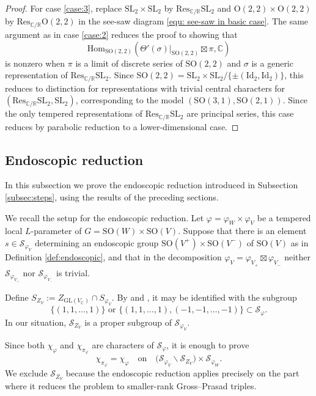 \documentclass[12pt]{amsart}
\numberwithin{equation}{subsection}
\newcommand{\BC}{{\mathbb {C}}}
\newcommand{\BR}{{\mathbb {R}}}
\newcommand{\CS}{{\mathcal {S}}}
\newcommand{\RO}{{\mathrm {O}}}
\newcommand{\GL}{{\mathrm{GL}}}
\newcommand{\Hom}{{\mathrm{Hom}}}
\newcommand{\Id}{{\mathrm{Id}}}
\newcommand{\Res}{{\mathrm{Res}}}
\newcommand{\SL}{{\mathrm{SL}}}
\newcommand{\SO}{{\mathrm{SO}}}
\newcommand{\bs}{\backslash}
\def\vphi{\varphi}
\def\SO{\mathrm{SO}}
\begin{document}
\begin{proof}
For case \eqref{case:3}, replace $\SL_2\times\SL_2$ by
$\Res_{\BC/\BR}\SL_2$ and $\RO(2,2)\times \RO(2,2)$ by
$\Res_{\BC/\BR}\RO(2,2)$ in the see-saw diagram
\eqref{equ: see-saw in basic case}. The same argument as in case
\eqref{case:2} reduces the proof to showing that
\[
\Hom_{\SO(2,2)}(\Theta'(\sigma)|_{\SO(2,2)}\boxtimes \pi,\BC)
\]
is nonzero when $\pi$ is a limit of discrete series of $\SO(2,2)$ and
$\sigma$ is a generic representation of $\Res_{\BC/\BR}\SL_2$. Since
$\SO(2,2)=\SL_2\times \SL_2/\{\pm (\Id_2,\Id_2)\}$, this reduces to
distinction for representations with trivial central characters for
$(\Res_{\BC/\BR}\SL_2,\SL_2)$, corresponding to the model
$(\SO(3,1),\SO(2,1))$. Since the only tempered representations of
$\Res_{\BC/\BR}\SL_2$ are principal series, this case reduces by parabolic
reduction to a lower-dimensional case.
\end{proof}

\subsection{Endoscopic reduction}\label{subsec:endoscopic}
In this subsection we prove the endoscopic reduction introduced in Subsection
\ref{subsec:steps}, using the results of the preceding sections.

We recall the setup for the endoscopic reduction. Let
$\vphi=\vphi_W\times \vphi_V$ be a tempered local $L$-parameter of
$G=\SO(W)\times \SO(V)$. Suppose that there is an element
$s\in \mathcal{S}_{\varphi_V}$ determining an endoscopic group
$\SO(V^+)\times \SO(V^-)$ of $\SO(V)$ as in Definition
\ref{def:endoscopic}, and that in the decomposition
$\varphi_V=\varphi_{V_+}\boxtimes \varphi_{V_-}$ neither
$\CS_{\varphi_{V_+}}$ nor $\CS_{\varphi_{V_-}}$ is trivial.

Define $S_{Z_V}:=Z_{\GL(V_{\BC})}\cap S_{\varphi_V}$. By \cite[(10.4)]{MR1186476} and \cite[Prop.~10.5]{MR1186476}, it may be identified with the subgroup
\[
\{(1,1,\ldots,1)\}\text{ or }\{(1,1,\ldots,1),(-1,-1,\ldots,-1)\}\subset\CS_\vphi.
\]
In our situation, $\CS_{Z_V}$ is a proper subgroup of $\CS_{\vphi_V}$.

Since both $\chi_\vphi$ and $\chi_{\pi_\vphi}$ are characters of $\CS_\vphi$, it is enough to prove
\[
\chi_{\pi_\vphi} = \chi_\vphi
\quad \text{on}\quad
\big(\CS_{\vphi_V}\bs \CS_{Z_V} \big)\times \CS_{\vphi_W}.
\]
We exclude $\CS_{Z_V}$ because the endoscopic reduction applies precisely on
the part where it reduces the problem to smaller-rank Gross--Prasad triples.
\end{document}
